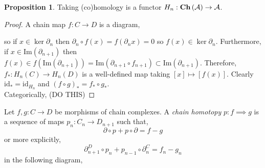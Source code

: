 \documentclass[12pt]{article}
\renewcommand{\Im}[1]{\mathrm{Im}(#1)}
\newcommand{\id}{\mathrm{id}}
\newcommand{\A}{\mathcal{A}}
\theoremstyle{remark}
\theoremstyle{definition}
\newtheorem{proposition}[theorem]{Proposition}
\newenvironment{definition}[1][Definition:]{\begin{trivlist}
\item[\hskip \labelsep {\bfseries #1}]}{\end{trivlist}}
\begin{document}
\begin{proposition}
Taking (co)homology is a functor $H_n : \Ch{\A} \to \A$.
\end{proposition}

\begin{proof}
A chain map $f : C \to D$ is a diagram,
\begin{center}
\end{center}
so if $x \in \ker{\partial_n}$ then $\partial_n \circ f(x) = f(\partial_n x) = 0$ so $f(x) \in \ker{\partial_n}$. Furthermore, if $x \in \Im{\partial_{n+1}}$ then $f(x) \in f(\Im{\partial_{n+1}}) = \Im{\partial_{n+1} \circ f_{n+1}} \subset \Im{\partial_{n+1}}$. Therefore, $f_* : H_n(C) \to H_n(D)$ is a well-defined map taking $[x] \mapsto [f(x)]$. Clearly $\id_* = \id_{H_n}$ and $(f \circ g)_* = f_* \circ g_*$.
\bigskip\\
Categorically,   
(DO THIS)
\end{proof}

\begin{definition}
Let $f, g : C \to D$ be morphisms of chain complexes. A \textit{chain homotopy} $p : f \implies g$ is a sequence of maps $p_n : C_n \to D_{n+1}$ such that, 
\[ \partial \circ p + p \circ \partial = f - g \]
or more explicitly,
\[ 
\partial^D_{n+1} \circ p_n + p_{n-1} \circ \partial^C_{n} = f_n - g_n \] 
in the following diagram,
\begin{center}
\end{center}
\end{definition}
\end{document}
